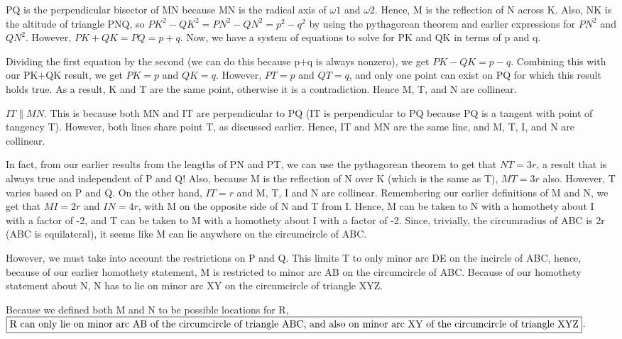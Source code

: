 \begin{enumerate}
 
PQ is the perpendicular bisector of MN because MN is the radical axis of $\omega1$ and $\omega2$. Hence, M is the reflection of N across K. Also, NK is the altitude of triangle PNQ, so $PK^2-QK^2 = PN^2-QN^2 = p^2 - q^2$ by using the pythagorean theorem and earlier expressions for $PN^2$ and $QN^2$. However, $PK+QK=PQ=p+q$. Now, we have a system of equations to solve for PK and QK in terms of p and q.

 
Dividing the first equation by the second (we can do this because p+q is always nonzero), we get $PK-QK=p-q$. Combining this with our PK+QK result, we get $PK = p$ and $QK = q$. However, $PT = p$ and $QT = q$, and only one point can exist on PQ for which this result holds true. As a result, K and T are the same point, otherwise it is a contradiction. Hence M, T, and N are collinear.

 
$IT \parallel MN$. This is because both MN and IT are perpendicular to PQ (IT is perpendicular to PQ because PQ is a tangent with point of tangency T). However, both lines share point T, as discussed earlier. Hence, IT and MN are the same line, and M, T, I, and N are collinear.

 
In fact, from our earlier results from the lengths of PN and PT, we can use the pythagorean theorem to get that $NT = 3r$, a result that is always true and independent of P and Q! Also, because M is the reflection of N over K (which is the same as T), $MT = 3r$ also. However, T varies based on P and Q. On the other hand, $IT = r$ and M, T, I and N are collinear. Remembering our earlier definitions of M and N, we get that $MI = 2r$ and $IN = 4r$, with M on the opposite side of N and T from I. Hence, M can be taken to N with a homothety about I with a factor of -2, and T can be taken to M with a homothety about I with a factor of -2. Since, trivially, the circumradius of ABC is 2r (ABC is equilateral), it seems like M can lie anywhere on the circumcircle of ABC.

 
However, we must take into account the restrictions on P and Q. This limits T to only minor arc DE on the incircle of ABC, hence, because of our earlier homothety statement, M is restricted to minor arc AB on the circumcircle of ABC.  Because of our homothety statement about N, N has to lie on minor arc XY on the circumcircle of triangle XYZ.

 
Because we defined both M and N to be possible locations for R, $\fbox{R can only lie on minor arc AB of the circumcircle of triangle ABC, and also on minor arc XY of the circumcircle of triangle XYZ}$.


\end{enumerate}

